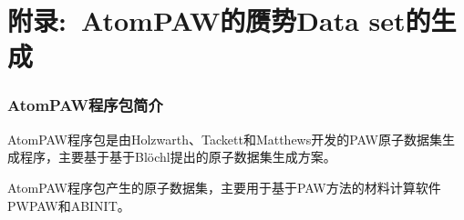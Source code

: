 \section{附录:~\rm{AtomPAW}的赝势\rm{Data set}的生成}
\frame
{
	\frametitle{\textrm{AtomPAW}程序包简介}
	\textrm{AtomPAW}程序包是由\textrm{Holzwarth}、\textrm{Tackett}和\textrm{Matthews}开发的\textrm{PAW}原子数据集生成程序，主要基于基于\textrm{Bl\"ochl}提出的原子数据集生成方案。

	\textrm{AtomPAW}程序包产生的原子数据集，主要用于基于\textrm{PAW}方法的材料计算软件\textrm{PWPAW}和\textrm{ABINIT}。

}

